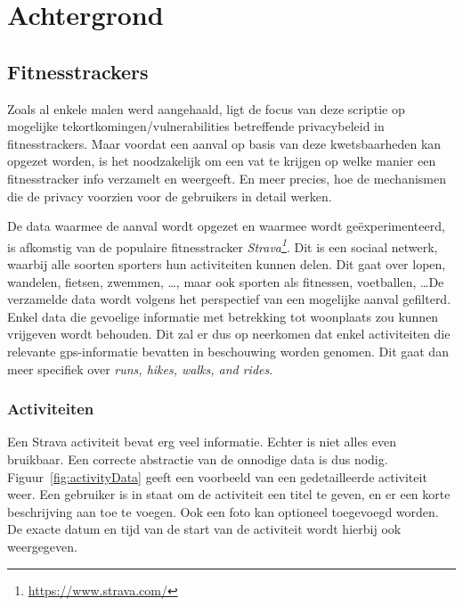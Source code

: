 
\chapter{Achtergrond}

\section{Fitnesstrackers}
Zoals al enkele malen werd aangehaald, ligt de focus van deze scriptie op
mogelijke tekortkomingen/vulnerabilities betreffende privacybeleid in
fitnesstrackers. Maar voordat een aanval op basis van deze kwetsbaarheden kan
opgezet worden, is het noodzakelijk om een vat te krijgen op welke manier een
fitnesstracker info verzamelt en weergeeft. En meer precies, hoe de mechanismen
die de privacy voorzien voor de gebruikers in detail werken.

De data waarmee de aanval wordt opgezet en waarmee wordt geëxperimenteerd, is
afkomstig van de populaire fitnesstracker
\textit{Strava\footnote{\url{https://www.strava.com/}}}. Dit is een sociaal
netwerk, waarbij alle soorten sporters hun activiteiten kunnen delen. Dit gaat
over lopen, wandelen, fietsen, zwemmen, \ldots, maar ook sporten als fitnessen,
voetballen, \ldots De verzamelde data wordt volgens het perspectief van een
mogelijke aanval gefilterd. Enkel data die gevoelige informatie met betrekking
tot woonplaats zou kunnen vrijgeven wordt behouden. Dit zal er dus op neerkomen
dat enkel activiteiten die relevante \ac{gps}-informatie bevatten in
beschouwing worden genomen. Dit gaat dan meer specifiek over \textit{runs,
    hikes, walks, and rides}.

\subsection{Activiteiten}\label{data}
Een Strava activiteit bevat erg veel informatie. Echter is niet alles even
bruikbaar. Een correcte abstractie van de onnodige data is dus nodig.
Figuur~\ref{fig:activityData} geeft een voorbeeld van een gedetailleerde
activiteit weer. Een gebruiker is in staat om de activiteit een titel te geven,
en er een korte beschrijving aan toe te voegen. Ook een foto kan optioneel
toegevoegd worden. De exacte datum en tijd van de start van de activiteit wordt
hierbij ook weergegeven.

